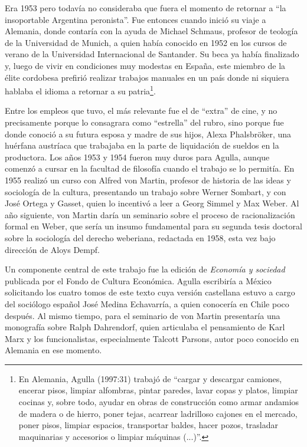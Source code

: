 Era 1953 pero todavía no consideraba que fuera el momento de retornar a ``la insoportable Argentina peronista''. Fue entonces cuando inició su viaje a Alemania, donde contaría con la ayuda de Michael Schmaus, profesor de teología de la Universidad de Munich, a quien había conocido en 1952 en los cursos de verano de la Universidad Internacional de Santander. Su beca ya había finalizado y, luego de vivir en condiciones muy modestas en España, este miembro de la élite cordobesa prefirió realizar trabajos manuales en un país donde ni siquiera hablaba el idioma a retornar a su patria\footnote{En Alemania, Agulla (1997:31) trabajó de ``cargar y descargar camiones, encerar pisos, limpiar alfombras, pintar paredes, lavar copas y platos, limpiar cocinas y, sobre todo, ayudar en obras de construcción como armar andamios de madera o de hierro, poner tejas, acarrear ladrilloso cajones en el mercado, poner pisos, limpiar espacios, transportar baldes, hacer pozos, trasladar maquinarias y accesorios o limpiar máquinas (...)''.}.

Entre los empleos que tuvo, el más relevante fue el de ``extra'' de cine, y no precisamente porque lo consagrara como ``estrella'' del rubro, sino porque fue donde conoció a su futura esposa y madre de sus hijos, Alexa Phalsbröker, una huérfana austríaca que trabajaba en la parte de liquidación de sueldos en la productora. Los años 1953 y 1954 fueron muy duros para Agulla, aunque comenzó a cursar en la facultad de filosofía cuando el trabajo se lo permitía. En 1955 realizó un curso con Alfred von Martin, profesor de historia de las ideas y sociología de la cultura, presentando un trabajo sobre Werner Sombart, y con José Ortega y Gasset, quien lo incentivó a leer a Georg Simmel y Max Weber. Al año siguiente, von Martin daría un seminario sobre el proceso de racionalización formal en Weber, que sería un insumo fundamental para su segunda tesis doctoral sobre la sociología del derecho weberiana, redactada en 1958, esta vez bajo dirección de Aloys Dempf.

Un componente central de este trabajo fue la edición de \emph{Economía y sociedad} publicada por el Fondo de Cultura Económica. Agulla escribiría a México solicitando los cuatro tomos de este texto cuya versión castellana estuvo a cargo del sociólogo español José Medina Echavarría, a quien conocería en Chile poco después. Al mismo tiempo, para el seminario de von Martin presentaría una monografía sobre Ralph Dahrendorf, quien articulaba el pensamiento de Karl Marx y los funcionalistas, especialmente Talcott Parsons, autor poco conocido en Alemania en ese momento.

